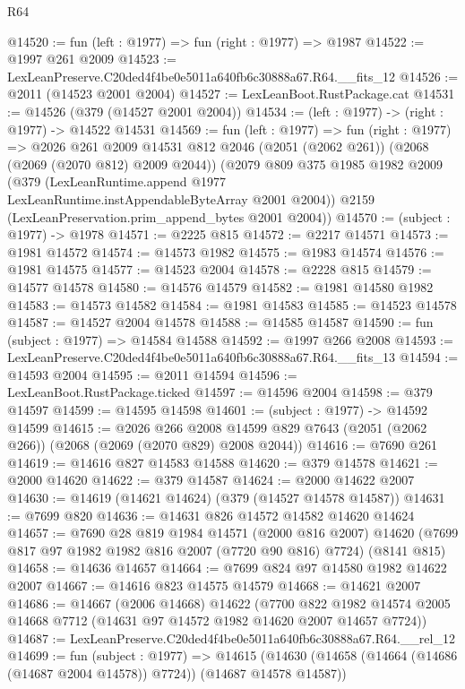 \begin{lexlean}{R64}
\begin{coremodule}
@14520 := fun (left : @1977) => fun (right : @1977) => @1987
@14522 := @1997 @261 @2009
@14523 := LexLeanPreserve.C20ded4f4be0e5011a640fb6c30888a67.R64.__fits_12
@14526 := @2011 (@14523 @2001 @2004)
@14527 := LexLeanBoot.RustPackage.cat
@14531 := @14526 (@379 (@14527 @2001 @2004))
@14534 := (left : @1977) -> (right : @1977) -> @14522 @14531
@14569 := fun (left : @1977) =>
  fun (right : @1977) =>
  @2026
    @261
    @2009
    @14531
    @812
    @2046
    (@2051 (@2062 @261))
    (@2068 (@2069 (@2070 @812) @2009 @2044))
    (@2079
      @809
      @375
      @1985
      @1982
      @2009
      (@379 (LexLeanRuntime.append @1977 LexLeanRuntime.instAppendableByteArray @2001 @2004))
      @2159
      (LexLeanPreservation.prim_append_bytes @2001 @2004))
@14570 := (subject : @1977) -> @1978
@14571 := @2225 @815
@14572 := @2217 @14571
@14573 := @1981 @14572
@14574 := @14573 @1982
@14575 := @1983 @14574
@14576 := @1981 @14575
@14577 := @14523 @2004
@14578 := @2228 @815
@14579 := @14577 @14578
@14580 := @14576 @14579
@14582 := @1981 @14580 @1982
@14583 := @14573 @14582
@14584 := @1981 @14583
@14585 := @14523 @14578
@14587 := @14527 @2004 @14578
@14588 := @14585 @14587
@14590 := fun (subject : @1977) => @14584 @14588
@14592 := @1997 @266 @2008
@14593 := LexLeanPreserve.C20ded4f4be0e5011a640fb6c30888a67.R64.__fits_13
@14594 := @14593 @2004
@14595 := @2011 @14594
@14596 := LexLeanBoot.RustPackage.ticked
@14597 := @14596 @2004
@14598 := @379 @14597
@14599 := @14595 @14598
@14601 := (subject : @1977) -> @14592 @14599
@14615 := @2026
    @266
    @2008
    @14599
    @829
    @7643
    (@2051 (@2062 @266))
    (@2068 (@2069 (@2070 @829) @2008 @2044))
@14616 := @7690 @261
@14619 := @14616 @827 @14583 @14588
@14620 := @379 @14578
@14621 := @2000 @14620
@14622 := @379 @14587
@14624 := @2000 @14622 @2007
@14630 := @14619 (@14621 @14624) (@379 (@14527 @14578 @14587))
@14631 := @7699 @820
@14636 := @14631 @826 @14572 @14582 @14620 @14624
@14657 := @7690
    @28
    @819
    @1984
    @14571
    (@2000 @816 @2007)
    @14620
    (@7699 @817 @97 @1982 @1982 @816 @2007 (@7720 @90 @816) @7724)
    (@8141 @815)
@14658 := @14636 @14657
@14664 := @7699 @824 @97 @14580 @1982 @14622 @2007
@14667 := @14616 @823 @14575 @14579
@14668 := @14621 @2007
@14686 := @14667
    (@2006 @14668)
    @14622
    (@7700 @822 @1982 @14574 @2005 @14668 @7712 (@14631 @97 @14572 @1982 @14620 @2007 @14657 @7724))
@14687 := LexLeanPreserve.C20ded4f4be0e5011a640fb6c30888a67.R64.__rel_12
@14699 := fun (subject : @1977) =>
  @14615 (@14630 (@14658 (@14664 (@14686 (@14687 @2004 @14578)) @7724)) (@14687 @14578 @14587))

\end{coremodule}
\end{lexlean}
